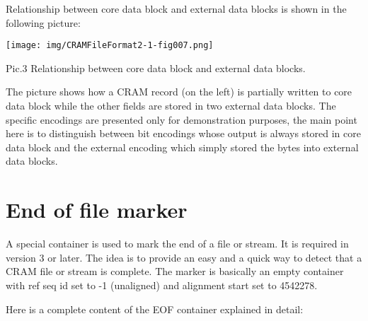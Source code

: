 \documentclass[a4paper]{article}
\begin{document}
Relationship between core data block and external data blocks is shown in the following 
picture: 

\texttt{[image: img/CRAMFileFormat2-1-fig007.png]}

Pic.3 Relationship between core data block and external data blocks.

The picture shows how a CRAM record (on the left) is partially written to core 
data block while the other fields are stored in two external data blocks. The specific 
encodings are presented only for demonstration purposes, the main point here is 
to distinguish between bit encodings whose output is always stored in core data 
block and the external encoding which simply stored the bytes into external data 
blocks.

\section{\textbf{End of file marker}}

A special container is used to mark the end of a file or stream. It is required in version 3 or later. The idea is to provide an easy and a quick way to detect that a CRAM file or stream is complete. The marker is basically an empty container with ref seq id set to -1 (unaligned) and alignment 
start set to 4542278.

Here is a complete content of the EOF container explained in detail:
\end{document}
